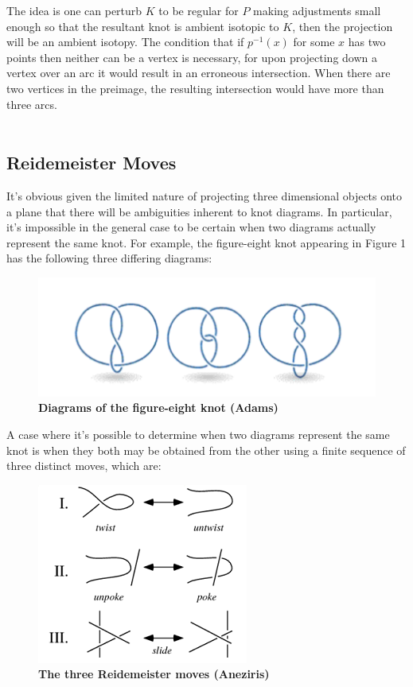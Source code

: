\documentclass{article}
\begin{document}
The idea is one can perturb $K$ to be regular for $P$ making adjustments small enough so that the resultant knot is ambient isotopic to $K$, then the projection will be an ambient isotopy.  The condition that if $p^{-1}(x)$ for some $x$ has two points then neither can be a vertex is necessary, for upon projecting down a vertex over an arc it would result in an erroneous intersection.  When there are two vertices in the preimage, the resulting intersection would have more than three arcs.
\\
\\
\subsection{Reidemeister Moves}
It's obvious given the limited nature of projecting three dimensional objects onto a plane that there will be ambiguities inherent to knot diagrams.  In particular, it's impossible in the general case to be certain when two diagrams actually represent the same knot. For example, the figure-eight knot appearing in Figure 1 has the following three differing diagrams:
\begin{figure}[htb!]
	\begin{center}
	\includegraphics{figure8.png}
	\caption \textbf{Diagrams of the figure-eight knot (Adams)}
	\end{center}
\end{figure}

\noindent A case where it's possible to determine when two diagrams represent the same knot is when they both may be obtained from the
other using a finite sequence of three distinct moves, which are:

\begin{figure}[h!]
	\begin{center}
	\includegraphics{moves.png}
	\caption \textbf{The three Reidemeister moves (Aneziris)}
	\end{center}
\end{figure} 
\clearpage
\end{document}

